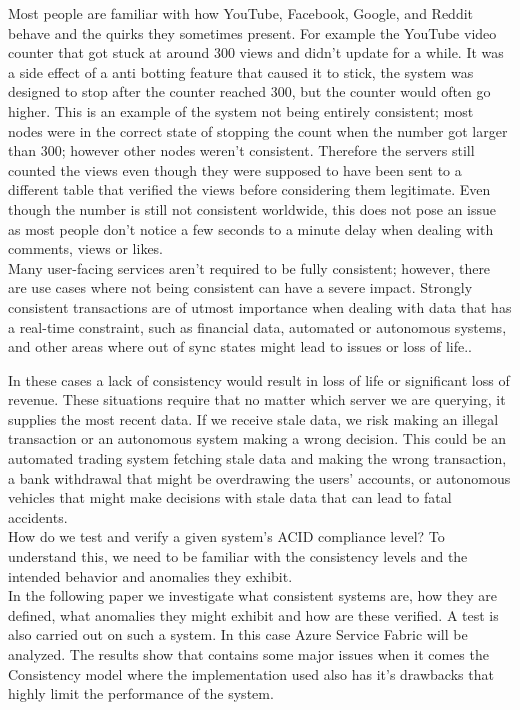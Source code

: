 \documentclass[a4paper,10pt,titlepage]{report}
\begin{document}
    Most people are familiar with how YouTube, Facebook, Google, and Reddit behave and the quirks they sometimes present.
    For example the YouTube video counter that got stuck at around 300 views and didn't update for a while. It was a side effect of a anti botting feature that caused it to stick, the system was designed to stop after the counter reached 300, but the counter would often go higher. This is an example of the system not being entirely consistent; most nodes were in the correct state of stopping the count when the number got larger than 300; however other nodes weren't consistent. Therefore the servers still counted the views even though they were supposed to have been sent to a different table that verified the views before considering them legitimate. Even though the number is still not consistent worldwide, this does not pose an issue as most people don't notice a few seconds to a minute delay when dealing with comments, views or likes.
    \\
    Many user-facing services aren't required to be fully consistent; however, there are use cases where not being consistent can have a severe impact. Strongly consistent transactions are of utmost importance when dealing with data that has a real-time constraint, such as financial data, automated or autonomous systems, and other areas where out of sync states might lead to issues or loss of life..

    In these cases a lack of consistency would result in loss of life or significant loss of revenue. These situations require that no matter which server we are querying, it supplies the most recent data. If we receive stale data, we risk making an illegal transaction or an autonomous system making a wrong decision. This could be an automated trading system fetching stale data and making the wrong transaction, a bank withdrawal that might be overdrawing the users' accounts, or autonomous vehicles that might make decisions with stale data that can lead to fatal accidents. \\

    \vspace{5mm}
    How do we test and verify a given system's ACID compliance level? To understand this, we need to be familiar with the consistency levels and the intended behavior and anomalies they exhibit.\\
    \vspace{5mm}
    In the following paper we investigate what consistent systems are, how they are defined, what anomalies they might exhibit and how are these verified. A test is also carried out on such a system. In this case Azure Service Fabric will be analyzed. The results show that contains some major issues when it comes the Consistency model where the implementation used also has it's drawbacks that highly limit the performance of the system.\\
    \vspace{5mm}
    \newpage
\end{document}
